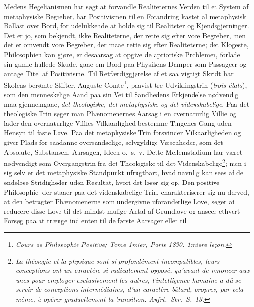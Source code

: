 \documentclass[12pt]{article}
\newcommand{\opage}[1]{\marginnote{\footnotesize\textit{[#1]}}}
\begin{document}
\noindent
Medens Hegelianismen har søgt at forvandle Realiteternes
Verden til et System af metaphysiske Begreber, har Positivismen
til en Forandring kastet al metaphysisk Ballast over Bord, for
udelukkende at holde sig til Realiteter og Kjendsgjerninger.
Det er jo, som bekjendt, ikke Realiteterne, der rette sig efter
vore Begreber, men det er omvendt vore Begreber, der maae
rette sig efter Realiteterne; det Klogeste, Philosophien kan gjøre,
er desaarsag at opgive de aprioriske Problemer, forlade sin
gamle hullede Skude, gaae om Bord paa Physikens Damper
som Passageer og antage Titel af Positivisme. Til
Retfærdiggjørelse af et saa vigtigt Skridt har Skolens berømte Stifter,
Auguste Comte\footnote{\textit{Cours de Philosophie Positive; Tome 1mier,
Paris 1830. 1miere leçon.}}, paavist tre Udviklingstrin (\textit{trois états}), som
den menneskelige Aand paa sin Vei til Sandhedens Erkjendelse
nødvendig maa gjennemgaae, \emph{det theologiske, det
metaphysiske og det videnskabelige}. Paa det theologiske
Trin søger man Phænomenernes Aarsag i en overnaturlig Villie og
\opage{28} lader den overnaturlige Villies Vilkaarlighed bestemme Tingenes
Gang uden Hensyn til faste Love. Paa det metaphysiske
Trin forsvinder Vilkaarligheden og giver Plads for saadanne
oversandselige, selvgyldige Væsenheder, som det Absolute,
Substansen, Aarsagen, Ideen o.\ s.\ v. Dette Mellemstadium har
været nødvendigt som Overgangstrin fra det Theologiske til
det Videnskabelige\footnote{\textit{La théologie et la physique sont si
profondément incompatibles, leurs conceptions ont un caractère si radicalement
opposé, qu'avant de renoncer aux unes pour employer exclusivement les autres,
l'intelligence humaine a dû se servir de conceptions intermédiaires, d'un
caractère bâtard, propres, par cela même, à opérer graduellement la
transition. Anfrt.\ Skr.\ S.\ 13.}}; men i sig selv er det metaphysiske
Standpunkt ufrugtbart, hvad navnlig kan sees af de endeløse
Stridigheder uden Resultat, hvori det løser sig op. Den positive
Philosophie, der staaer paa det videnskabelige Trin,
charakteriserer sig nu derved, at den betragter Phænomenerne som
undergivne uforanderlige Love, søger at reducere disse Love til
det mindst mulige Antal af Grundlove og anseer ethvert
Forsøg paa at trænge ind enten til de første Aarsager eller til
\end{document}
